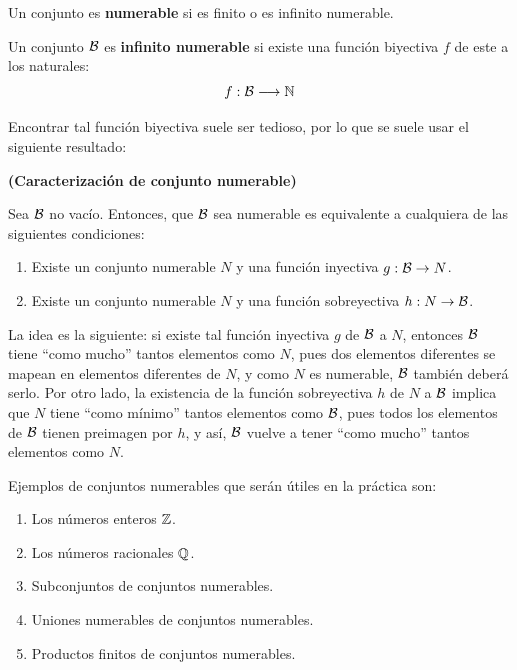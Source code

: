 \begin{deff}
    Un conjunto es {\bf numerable} si es finito o es infinito numerable.
\end{deff}

\begin{deff}
    Un conjunto $\mathcal{B}$ es {\bf infinito numerable} si existe una función biyectiva $f$ de este a los naturales:
    \[f: \mathcal{B} \longrightarrow \mathbb{N}\]
\end{deff}

Encontrar tal función biyectiva suele ser tedioso, por lo que se suele usar el siguiente resultado:

\begin{prop}
    {\bf (Caracterización de conjunto numerable)}
    \item Sea $\mathcal{B}$ no vacío. Entonces, que $\mathcal{B}$ sea numerable es equivalente a cualquiera de las siguientes condiciones:
    \begin{enumerate}[label=\roman*)]
        \item Existe un conjunto numerable $N$ y una función inyectiva $g: \mathcal{B} \to N$.
        \item Existe un conjunto numerable $N$ y una función sobreyectiva $h: N \to \mathcal{B}$.
    \end{enumerate}
    La idea es la siguiente: si existe tal función inyectiva $g$ de $\mathcal{B}$ a $N$, entonces $\mathcal{B}$ tiene ``como mucho'' tantos elementos como $N$, pues dos elementos diferentes se mapean en elementos diferentes de $N$, y como $N$ es numerable, $\mathcal{B}$ también deberá serlo. Por otro lado, la existencia de la función sobreyectiva $h$ de $N$ a $\mathcal{B}$ implica que $N$ tiene ``como mínimo'' tantos elementos como $\mathcal{B}$, pues todos los elementos de $\mathcal{B}$ tienen preimagen por $h$, y así, $\mathcal{B}$ vuelve a tener ``como mucho'' tantos elementos como $N$.
\end{prop}

Ejemplos de conjuntos numerables que serán útiles en la práctica son:
\begin{enumerate}[topsep=5pt,label=--, itemsep=0pt]
    \item Los números enteros $\mathbb{Z}$.
    \item Los números racionales $\mathbb{Q}$.
    \item Subconjuntos de conjuntos numerables.
    \item Uniones numerables de conjuntos numerables.
    \item Productos finitos de conjuntos numerables.
\end{enumerate}

